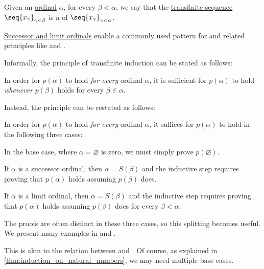 \begin{definition}\label{def:truncated_sequence}\mimprovised
  Given an \hyperref[def:ordinal]{ordinal} \( \alpha \), for every \( \beta < \alpha \), we say that the \hyperref[def:transfinite_sequence]{transfinite sequence} \( \seq{ x_\gamma }_{\gamma < \beta} \) is a  of \( \seq{ x_\gamma }_{\gamma < \alpha} \).
\end{definition}

\begin{remark}\label{rem:transfinite_induction_with_limit_ordinals}
  \hyperref[def:successor_and_limit_ordinal]{Successor and limit ordinals} enable a commonly used pattern for  and related principles like  and .

  Informally, the principle of transfinite induction can be stated as follows:
  \begin{displayquote}
    In order for \( p(\alpha) \) to hold \emph{for every} ordinal \( \alpha \), it is sufficient for \( p(\alpha) \) to hold \emph{whenever} \( p(\beta) \) holds for every \( \beta \in \alpha \).
  \end{displayquote}

  Instead, the principle can be restated as follows:
  \begin{displayquote}
    In order for \( p(\alpha) \) to hold \emph{for every} ordinal \( \alpha \), it suffices for \( p(\alpha) \) to hold in the following three cases:
    \begin{thmenum}
       In the base case, where \( \alpha = \varnothing \) is zero, we must simply prove \( p(\varnothing) \).

       If \( \alpha \) is a successor ordinal, then \( \alpha = S(\beta) \) and the inductive step requires proving that \( p(\alpha) \) holds assuming \( p(\beta) \) does.

       If \( \alpha \) is a limit ordinal, then \( \alpha = S(\beta) \) and the inductive step requires proving that \( p(\alpha) \) holds assuming \( p(\beta) \) does for every \( \beta < \alpha \).
    \end{thmenum}
  \end{displayquote}

  The proofs are often distinct in these three cases, so this splitting becomes useful. We present many examples in  and .
\end{remark}
\begin{comments}
  \item This is akin to the relation between  and . Of course, as explained in \cref{thm:induction_on_natural_numbers}, we may need multiple base cases.
\end{comments}

